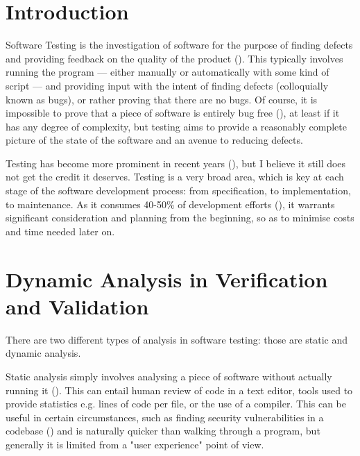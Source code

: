\documentclass[12pt]{article}
\begin{document}
\pagebreak


\tableofcontents
\pagebreak



\section{Introduction}

Software Testing is the investigation of software for the purpose of finding defects and providing feedback on the quality of the product (). This typically involves running the program --- either manually or automatically with some kind of script --- and providing input with the intent of finding defects (colloquially known as bugs), or rather proving that there are no bugs. Of course, it is impossible to prove that a piece of software is entirely bug free (), at least if it has any degree of complexity, but testing aims to provide a reasonably complete picture of the state of the software and an avenue to reducing defects.

Testing has become more prominent in recent years (), but I believe it still does not get the credit it deserves. Testing is a very broad area, which is key at each stage of the software development process: from specification, to implementation, to maintenance. As it consumes 40-50\% of development efforts (), it warrants significant consideration and planning from the beginning, so as to minimise costs and time needed later on.



\section{Dynamic Analysis in Verification and Validation} \label{veri_vali}

There are two different types of analysis in software testing: those are static and dynamic analysis. 

Static analysis simply involves analysing a piece of software without actually running it (). This can entail human review of code in a text editor, tools used to provide statistics e.g. lines of code per file, or the use of a compiler. This can be useful in certain circumstances, such as finding security vulnerabilities in a codebase () and is naturally quicker than walking through a program, but generally it is limited from a "user experience" point of view.
\end{document}
